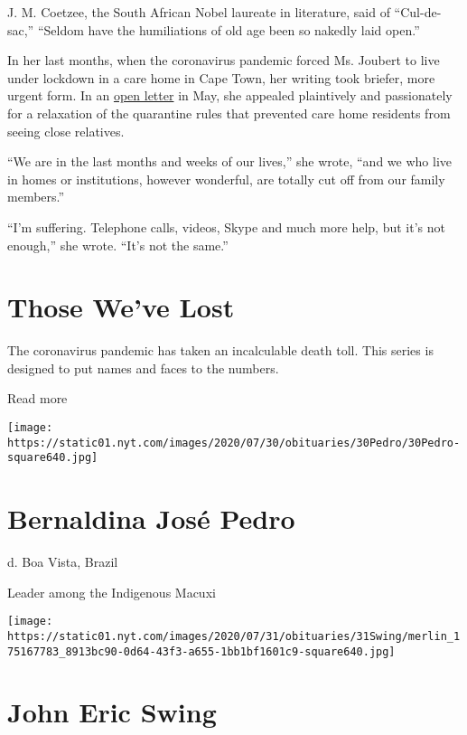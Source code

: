 J. M. Coetzee, the South African Nobel laureate in literature, said of
``Cul-de-sac,'' ``Seldom have the humiliations of old age been so
nakedly laid open.''

In her last months, when the coronavirus pandemic forced Ms. Joubert to
live under lockdown in a care home in Cape Town, her writing took
briefer, more urgent form. In an
\href{https://www.news24.com/arts/literature/iconic-sa-author-elsa-joubert-97-dies-of-covid-19-20200614}{open
letter} in May, she appealed plaintively and passionately for a
relaxation of the quarantine rules that prevented care home residents
from seeing close relatives.

``We are in the last months and weeks of our lives,'' she wrote, ``and
we who live in homes or institutions, however wonderful, are totally cut
off from our family members.''

``I'm suffering. Telephone calls, videos, Skype and much more help, but
it's not enough,'' she wrote. ``It's not the same.''

\href{https://www.nytimes.com/interactive/2020/obituaries/people-died-coronavirus-obituaries.html?action=click\&pgtype=Article\&state=default\&region=BELOW_MAIN_CONTENT\&context=covid_obits_promo}{}

\hypertarget{those-weve-lost}{%
\section{Those We've Lost}\label{those-weve-lost}}

The coronavirus pandemic has taken an incalculable death toll. This
series is designed to put names and faces to the numbers.

Read more

\texttt{[image: https://static01.nyt.com/images/2020/07/30/obituaries/30Pedro/30Pedro-square640.jpg]}

\hypertarget{bernaldina-josuxe9-pedro}{%
\section{Bernaldina José Pedro}\label{bernaldina-josuxe9-pedro}}

d. Boa Vista, Brazil

Leader among the Indigenous Macuxi

\texttt{[image: https://static01.nyt.com/images/2020/07/31/obituaries/31Swing/merlin\_175167783\_8913bc90-0d64-43f3-a655-1bb1bf1601c9-square640.jpg]}

\hypertarget{john-eric-swing}{%
\section{John Eric Swing}\label{john-eric-swing}}

